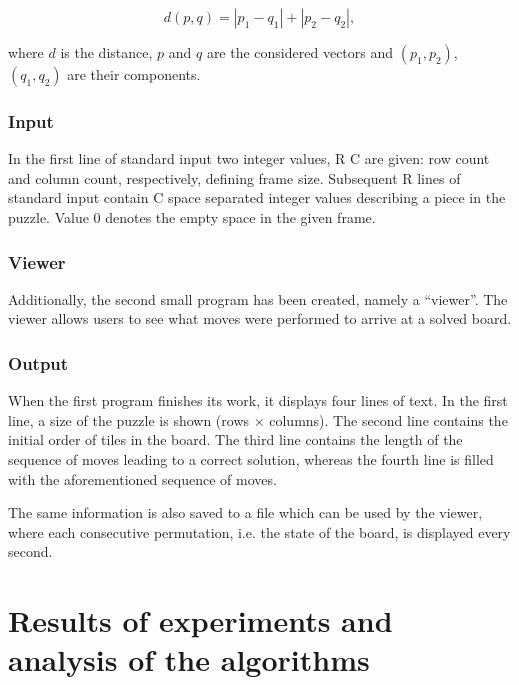 \documentclass[12pt]{article}
\begin{document}
\[
    d(p, q) = |p_1 - q_1| + |p_2 - q_2|,
\]

where $d$ is the distance, $p$ and $q$ are the considered vectors and $(p_1, p_2)$, $(q_1, q_2)$ are their components.

\subsubsection{Input}

In the first line of standard input two integer values, R C are given: row count and column count, respectively, defining frame size. Subsequent R lines of standard input contain C space separated integer values describing a piece in the puzzle. Value 0 denotes the empty space in the given frame.

\subsubsection{Viewer}

Additionally, the second small program has been created, namely a ``viewer''. The viewer allows users to see what moves were performed to arrive at a solved board.

\subsubsection{Output}

When the first program finishes its work, it displays four lines of text. In the first line, a size of the puzzle is shown (rows $\times$ columns). The second line contains the initial order of tiles in the board. The third line contains the length of the sequence of moves leading to a correct solution, whereas the fourth line is filled with the aforementioned sequence of moves.

The same information is also saved to a file which can be used by the viewer, where each consecutive permutation, i.e. the state of the board, is displayed every second.

\section{Results of experiments and analysis of the algorithms}

\newpage
\listoffigures
\newpage
\printbibliography
\end{document}
